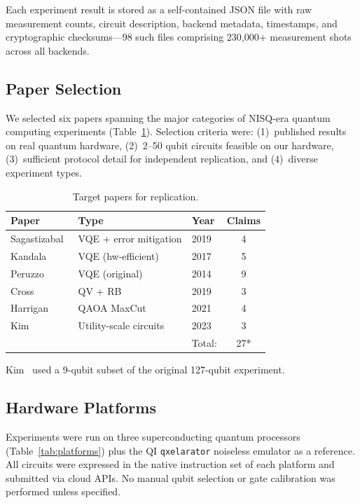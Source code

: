 \documentclass[twocolumn,prl,superscriptaddress,nofootinbib]{revtex4-2}
\begin{document}
Each experiment result is stored as a self-contained JSON file with raw measurement counts, circuit description, backend metadata, timestamps, and cryptographic checksums---98 such files comprising 230{,}000+ measurement shots across all backends.

\subsection{Paper Selection}

We selected six papers spanning the major categories of NISQ-era quantum computing experiments (Table~\ref{tab:papers}).
Selection criteria were: (1)~published results on real quantum hardware, (2)~2--50 qubit circuits feasible on our hardware, (3)~sufficient protocol detail for independent replication, and (4)~diverse experiment types.

\begin{table}[b]
\caption{Target papers for replication.}
\label{tab:papers}
\begin{ruledtabular}
\begin{tabular}{lllc}
Paper & Type & Year & Claims \\
\midrule
Sagastizabal~\cite{sagastizabal2019} & VQE + error mitigation & 2019 & 4 \\
Kandala~\cite{kandala2017} & VQE (hw-efficient) & 2017 & 5 \\
Peruzzo~\cite{peruzzo2014} & VQE (original) & 2014 & 9 \\
Cross~\cite{cross2019} & QV + RB & 2019 & 3 \\
Harrigan~\cite{harrigan2021} & QAOA MaxCut & 2021 & 4 \\
Kim~\cite{kim2023} & Utility-scale circuits & 2023 & 3 \\
\midrule
& & Total: & 27* \\
\end{tabular}
\end{ruledtabular}
\end{table}

\noindent *Kim~\cite{kim2023} used a 9-qubit subset of the original 127-qubit experiment.

\subsection{Hardware Platforms}

Experiments were run on three superconducting quantum processors (Table~\ref{tab:platforms}) plus the QI \texttt{qxelarator} noiseless emulator as a reference.
All circuits were expressed in the native instruction set of each platform and submitted via cloud APIs.
No manual qubit selection or gate calibration was performed unless specified.
\end{document}
